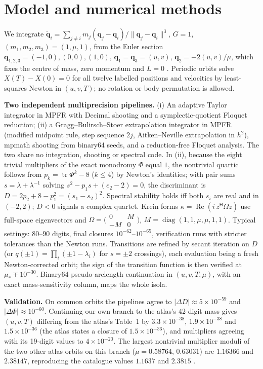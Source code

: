 \documentclass[10pt]{article}
\newcommand{\Om}{\Omega}
\begin{document}
\section{Model and numerical methods}
We integrate $\ddot{\mathbf q}_i=\sum_{j\ne i}m_j(\mathbf q_j-\mathbf q_i)/\|\mathbf q_j-\mathbf q_i\|^3$,
$G=1$, $(m_1,m_2,m_3)=(1,\mu,1)$, from the Euler section
$\mathbf q_{1,2,3}=(-1,0),(0,0),(1,0)$, $\dot{\mathbf q}_1=\dot{\mathbf q}_3=(u,v)$,
$\dot{\mathbf q}_2=-2(u,v)/\mu$, which fixes the centre of mass, zero momentum and $L=0$
\cite{atlasnote}. Periodic orbits solve $X(T)-X(0)=0$ for all twelve labelled positions and
velocities by least-squares Newton in $(u,v,T)$; no rotation or body permutation is allowed.

\textbf{Two independent multiprecision pipelines.} (i) An adaptive Taylor integrator in MPFR with
Decimal shooting and a symplectic-quotient Floquet reduction; (ii) a Gragg--Bulirsch--Stoer
extrapolation integrator in MPFR (modified midpoint rule, step sequence $2j$, Aitken--Neville
extrapolation in $h^2$), mpmath shooting from binary64 seeds, and a reduction-free Floquet
analysis. The two share no integration, shooting or spectral code. In (ii), because the eight
trivial multipliers of the exact monodromy $\Phi$ equal $1$, the nontrivial quartic follows from
$p_k=\operatorname{tr}\Phi^k-8$ ($k\le4$) by Newton's identities; with pair sums
$s=\lambda+\lambda^{-1}$ solving $s^2-p_1s+(e_2-2)=0$, the discriminant is
$D=2p_2+8-p_1^2=(s_1-s_2)^2$. Spectral stability holds iff both $s_i$ are real and in $(-2,2)$;
$D<0$ signals a complex quartet. Krein forms $\kappa=\operatorname{Re}(i\,z^{\mathsf H}\Om z)$ use
full-space eigenvectors and $\Om=\bigl(\begin{smallmatrix}0&M\\-M&0\end{smallmatrix}\bigr)$,
$M=\operatorname{diag}(1,1,\mu,\mu,1,1)$. Typical settings: 80--90 digits, final closures
$10^{-62}$--$10^{-65}$, verification runs with stricter tolerances than the Newton runs.
Transitions are refined by secant iteration on $D$ (or $q(\pm1)=\prod_i(\pm1-\lambda_i)$ for
$s=\pm2$ crossings), each evaluation being a fresh Newton-corrected orbit; the sign of the
transition function is then verified at $\mu_\ast\mp10^{-30}$. Binary64 pseudo-arclength
continuation in $(u,v,T,\mu)$, with an exact mass-sensitivity column, maps the whole isola.

\textbf{Validation.} On common orbits the pipelines agree to $|\Delta D|\approx5\times10^{-59}$
and $|\Delta\Phi|\approx10^{-60}$. Continuing our own branch to the atlas's 42-digit mass gives
$(u,v,T)$ differing from the atlas's Table~1 \cite{atlasnote} by $3.3\times10^{-38}$,
$1.9\times10^{-38}$ and $1.5\times10^{-36}$ (the atlas states a closure of $1.5\times10^{-36}$),
and multipliers agreeing with its 19-digit values to $4\times10^{-20}$. The largest nontrivial
multiplier moduli of the two other atlas orbits on this branch ($\mu=0.58764$, $0.63031$) are
$1.16366$ and $2.38147$, reproducing the catalogue values $1.1637$ and $2.3815$ \cite{atlas}.
\end{document}
